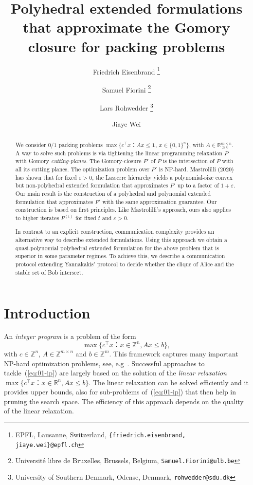 \documentclass[11pt]{article}
\title{Polyhedral extended formulations that approximate the Gomory closure for packing problems}
\author{
Friedrich Eisenbrand \thanks{EPFL, Lausanne, Switzerland, \texttt{\{friedrich.eisenbrand, jiaye.wei\}@epfl.ch}}
\and
Samuel Fiorini \thanks{Université libre de Bruxelles, Brussels, Belgium, \texttt{Samuel.Fiorini@ulb.be}}
\and
Lars Rohwedder \thanks{University of Southern Denmark, Odense, Denmark, \texttt{rohwedder@sdu.dk}}
\and
Jiaye Wei \footnotemark[1]
}
\date{} %
\newcommand{\larstodo}[1]{\todo[backgroundcolor=pinktransparent, linecolor=pink!80]{#1}}
\newcommand{\NP}{{\sf NP}}
\newcommand{\Z}{\mathbb{Z}}
\newcommand{\one}{\mathbf{1}}
\theoremstyle{remark}
\begin{document}
\maketitle

\begin{abstract}
  \noindent
  We consider $0/1$ packing problems  $\max\{c^\intercal x ： Ax≤\one, \, x ∈ \{0,1\}^n\}$, with $A ∈ ℝ_{≥0}^{m ×n}$. A way to solve such problems is via tightening  the linear programming relaxation  $P$ %
  with Gomory  \emph{cutting-planes}.  The Gomory-closure $P'$ of $P$ is the intersection of $P$ with all its cutting planes. 
  The optimization problem over $P'$  is \NP-hard. Mastrolilli (2020) has shown that for fixed $ε>0$, the  Lasserre hierarchy yields a  polynomial-size convex but non-polyhedral extended formulation that approximates $P'$ up to a factor of $1+ε$.  Our main result is the construction of a polyhedral and polynomial extended formulation that approximates $P'$ with the same approximation guarantee. Our construction is based on first principles. Like Mastrolilli's approach, ours also applies to higher iterates $P^{(t)}$ for fixed $t$ and $ε>0$.  

  In contrast to an explicit construction, communication complexity
  provides an alternative way to describe extended formulations. Using
  this approach we obtain a quasi-polynomial polyhedral extended
  formulation for the  above problem that is superior in some parameter regimes. To
  achieve this, we describe a communication protocol extending
  Yannakakis'  protocol to decide whether the clique of Alice
  and the stable set of Bob intersect.
  
  
\end{abstract}


\section{Introduction}
\label{sec:introduction}


An \emph{integer program} is a problem of the form
\begin{equation}
  \label{eq:01-ip}
  \max \{c^\intercal x ： x ∈ ℤ^n, Ax ≤ b \},  
\end{equation}
with $c ∈ ℤ^n$, $A ∈ ℤ^{m ×n}$ and $b ∈ ℤ^m$. This framework captures many important \NP-hard optimization problems, see, e.g~\cite{Schrijver03,wolsey2020integer}. Successful approaches to tackle~(\ref{eq:01-ip}) are largely based on the solution of the \emph{linear relaxation} %
  $\max \{c^\intercal x ： x ∈ ℝ^n, Ax ≤ b \}$. %
  The linear relaxation can be solved efficiently and it provides upper bounds, also for sub-problems of~(\ref{eq:01-ip}) that then help in pruning the search space. 
  The efficiency of this approach depends on the quality of the linear relaxation.
\end{document}

